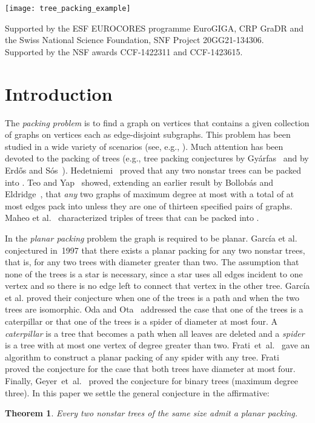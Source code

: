 \documentclass[11pt,a4paper,colorlinks=true,urlcolor=blue,citecolor=red]{article}
\theoremstyle{plain}
\newtheorem{theorem}{Theorem}
\begin{document}
\begin{titlepage}
  \vfill

  \begin{center}
    \texttt{[image: tree\_packing\_example]}
  \end{center}

  \vfill

\noindent
 \scriptsize Supported by the ESF EUROCORES programme EuroGIGA, CRP
 GraDR and the Swiss National Science Foundation, SNF
 Project 20GG21-134306.\\
 \scriptsize Supported by the NSF awards CCF-1422311 and
 CCF-1423615.


\end{titlepage}

\section{Introduction}\label{sec:introduction}
The \emph{packing problem} is to find a graph  on  vertices that
contains a given collection  of graphs on  vertices
each as edge-disjoint subgraphs. This problem has been studied in a wide
variety of scenarios (see, e.g., \cite{AkiyamaC90,CaroY97,FrSz}). Much
attention has been devoted to the packing of trees (e.g., tree packing
conjectures by Gy\'arfas~\cite{gl-ptdok-78} and by Erd\H{o}s and
S\'os~\cite{e-epgt-65}). Hedetniemi~\cite{MR629868} proved that any two
nonstar trees can be packed into . Teo and Yap~\cite{ty-ptgo-90}
showed, extending an earlier result by Bollob\'as and
Eldridge~\cite{be-pgacc-78}, that \emph{any} two graphs of maximum
degree at most  with a total of at most  edges pack into
 unless they are one of thirteen specified pairs of graphs. Maheo
et al{.}~\cite{msw-1996} characterized triples of trees that can be
packed into .

In the \emph{planar packing} problem the graph  is required to be
planar. Garc\'ia et al.~\cite{ghhnt-2002} conjectured in~1997 that there
exists a planar packing for any two nonstar trees, that is, for any two
trees with diameter greater than two. The assumption that none of the
trees is a star is necessary, since a star uses all edges incident to
one vertex and so there is no edge left to connect that vertex in the
other tree. Garc\'ia et al{.} proved their conjecture when one
of the trees is a path and when the two trees are isomorphic. Oda and
Ota~\cite{oo-2006} addressed the case that one of the trees is a
caterpillar or that one of the trees is a spider of diameter at most
four. A \emph{caterpillar} is a tree that becomes a path when all leaves
are deleted and a \emph{spider} is a tree with at most one vertex of
degree greater than two. Frati~et~al.~\cite{j-fgk-pptst-08} gave an
algorithm to construct a planar packing of any spider with any
tree. Frati~\cite{f-ppdft-09} proved the conjecture for the case that
both trees have diameter at most four. Finally,
Geyer~et~al.~\cite{gkh-ppbt-13} proved the conjecture for binary trees
(maximum degree three). In this paper we settle the general conjecture
in the affirmative:
\begin{theorem}\label{thm:planar_packing}
  Every two nonstar trees of the same size admit a planar packing.
\end{theorem}
\end{document}
